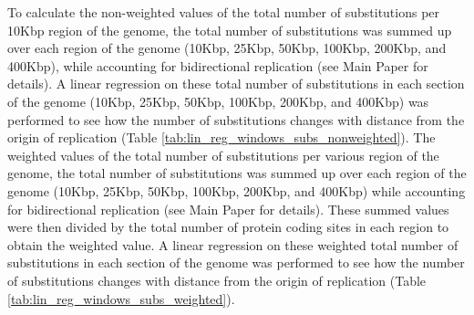 \documentclass[11pt]{article}
\begin{document}
To calculate the non-weighted values of the total number of substitutions per 10Kbp region of the genome, the total number of substitutions was summed up over each region of the genome (10Kbp, 25Kbp, 50Kbp, 100Kbp, 200Kbp, and 400Kbp), while accounting for bidirectional replication (see Main Paper for details).
A linear regression on these total number of substitutions in each section of the genome (10Kbp, 25Kbp, 50Kbp, 100Kbp, 200Kbp, and 400Kbp) was performed to see how the number of substitutions changes with distance from the origin of replication (Table \ref{tab:lin_reg_windows_subs_nonweighted}).
The weighted values of the total number of substitutions per various region of the genome, the total number of substitutions was summed up over each region of the genome (10Kbp, 25Kbp, 50Kbp, 100Kbp, 200Kbp, and 400Kbp) while accounting for bidirectional replication (see Main Paper for details).
These summed values were then divided by the total number of protein coding sites in each region to obtain the weighted value.
A linear regression on these weighted total number of substitutions in each section of the genome was performed to see how the number of substitutions changes with distance from the origin of replication (Table \ref{tab:lin_reg_windows_subs_weighted}).
\end{document}
